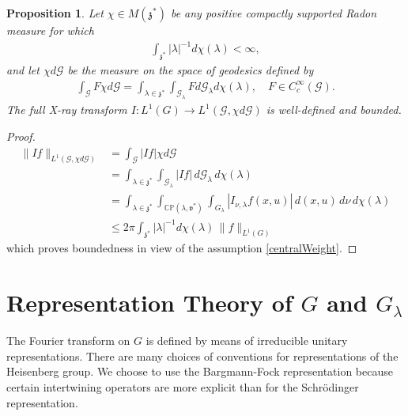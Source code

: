\documentclass[11pt]{amsart}
\theoremstyle{plain}
\newtheorem{proposition}[theorem]{Proposition}
\theoremstyle{definition}
\theoremstyle{remark}
\numberwithin{equation}{section}
\def\fz{\mathfrak{z}}
\def\fv{\mathfrak{v}}
\def\cG{\mathcal{G}}
\def\CP{\mathbb{CP}}
\numberwithin{equation}{section}
\begin{document}
\begin{proposition}
		Let $\chi\in M(\fz^*)$ be any positive compactly supported Radon measure for which
		\begin{align}\label{centralWeight}
			\int_{\fz^*}|\lambda|^{-1}d\chi(\lambda)<\infty,
		\end{align}
	and let $\chi d\cG$ be the measure on the space of geodesics defined by
	\begin{align*}
		\int_{\cG}F \chi d\cG=\int_{\lambda\in \fz^*}\int_{\cG_\lambda}F d\cG_\lambda d\chi(\lambda), \quad F\in C_c^\infty(\cG).
	\end{align*}
		The full X-ray transform $I: L^1(G)\to L^1(\cG, \chi d\cG)$ is well-defined and bounded. 
\end{proposition}
\begin{proof}
	\begin{align*}
		\|If\|_{L^1(\cG, \chi d\cG)}
		&=\int_{\cG}|If| \chi d\cG\\
		&=\int_{\lambda\in \fz^*}\int_{\cG_\lambda}|If|\, d\cG_\lambda\, d\chi(\lambda)\\
		&=\int_{\lambda\in \fz^*}\int_{\CP(\lambda, \fv^*)}\int_{G_{\lambda}}|I_{\nu, \lambda}f(x, u)|\, d(x, u)\, d\nu\, d\chi(\lambda)\\
		&\leq2\pi \int_{\fz^*}|\lambda|^{-1}d\chi(\lambda)\,\|f\|_{L^1(G)}
	\end{align*}
	which proves boundedness in view of the assumption \eqref{centralWeight}. 
\end{proof}


\section{Representation Theory of $G$ and $G_\lambda$}\label{s:representations}
The Fourier transform on $G$ is defined by means of irreducible unitary representations. 
There are many choices of conventions for representations of the Heisenberg group. We choose to use the Bargmann-Fock representation because certain intertwining operators are more explicit than for the Schr\"{o}dinger representation.  %
\end{document}
